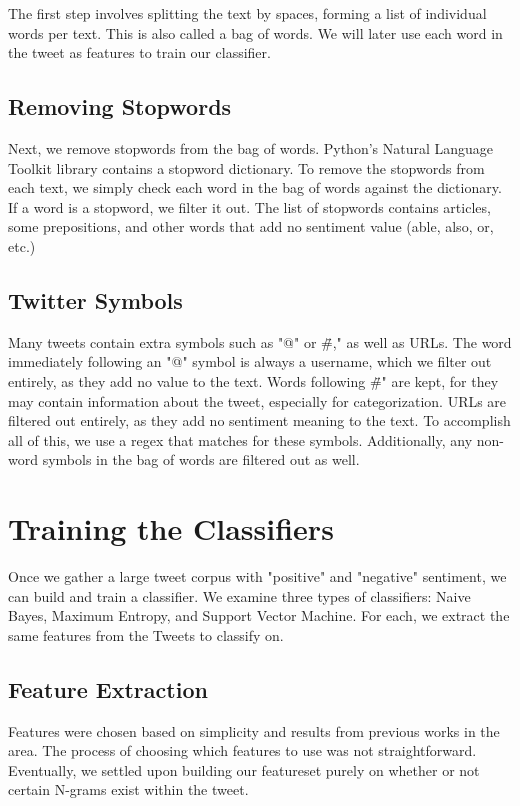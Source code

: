 \documentclass[preprint,pre,floats,aps,amsmath,amssymb,12pt]{revtex4}
\begin{document}
The first step involves splitting the text by spaces, forming a list of individual words per text. This is also called a bag of words. We will later use each word in the tweet as features to train our classifier. 

\subsection{Removing Stopwords}

Next, we remove stopwords from the bag of words. Python's Natural Language Toolkit library contains a stopword dictionary. To remove the stopwords from each text, we simply check each word in the bag of words against the dictionary. If a word is a stopword, we filter it out. The list of stopwords contains articles, some prepositions, and other words that add no sentiment value (able, also, or, etc.)

\subsection{Twitter Symbols}

Many tweets contain extra symbols such as "@" or \"\#," as well as URLs. The word immediately following an "@" symbol is always a username, which we filter out entirely, as they add no value to the text. Words following \"\#" are kept, for they may contain information about the tweet, especially for categorization. URLs are filtered out entirely, as they add no sentiment meaning to the text. To accomplish all of this, we use a regex that matches for these symbols.  Additionally, any non-word symbols in the bag of words are filtered out as well.

\section{Training the Classifiers}
\label{sec:train}

Once we gather a large tweet corpus with "positive" and "negative" sentiment, we can build and train a classifier. We examine three types of classifiers: Naive Bayes, Maximum Entropy, and Support Vector Machine. For each, we extract the same features from the Tweets to classify on.

\subsection{Feature Extraction}
Features were chosen based on simplicity and results from previous works in the area. The process of choosing which features to use was not straightforward. Eventually, we settled upon building our featureset purely on whether or not certain N-grams exist within the tweet. 
\end{document}
